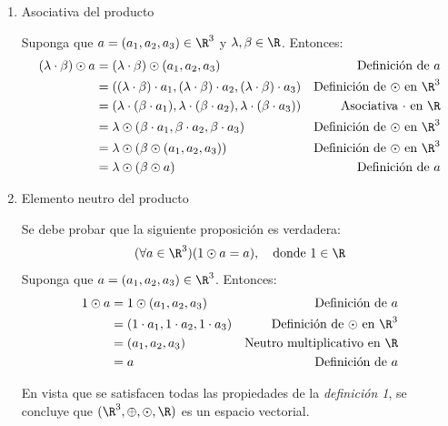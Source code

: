 \documentclass[compacto,10pt]{pubciencias-notas}
\begin{document}
\begin{ejem}
\begin{enumerate}
\item Asociativa del producto
    
Suponga que $a=(a_1,a_2,a_3)\in \R^{3}$ y $\lambda, \beta\in \R$. Entonces:
\begin{align*}
    (\lambda\cdot \beta) \odot a &= (\lambda\cdot \beta) \odot (a_1,a_2,a_3) & \text{Definición de $a$}\\
    &= ((\lambda\cdot \beta)\cdot a_1, (\lambda\cdot \beta)\cdot a_2, (\lambda\cdot \beta)\cdot a_3) & \text{Definición de $\odot$ en $\R^{3}$}\\
    &= (\lambda\cdot(\beta\cdot a_1), \lambda\cdot(\beta\cdot a_2), \lambda\cdot(\beta\cdot a_3)) & \text{Asociativa $\cdot$ en $\R$}\\
    &= \lambda \odot (\beta\cdot a_1, \beta\cdot a_2, \beta\cdot a_3) & \text{Definición de $\odot$ en $\R^{3}$}\\
    &= \lambda \odot (\beta \odot (a_1, a_2, a_3)) & \text{Definición de $\odot$ en $\R^{3}$}\\
    &= \lambda \odot (\beta \odot a) & \text{Definición de $a$}
\end{align*}
    
\item Elemento neutro del producto
    
Se debe probar que la siguiente proposición es verdadera:
\[(\forall a\in \R^{3})(1\odot a = a), \quad \text{donde } 1\in \R\]
Suponga que $a=(a_1,a_2,a_3)\in\R^{3}$. Entonces:
\begin{align*}
    1 \odot a &= 1\odot (a_1,a_2,a_3) & \text{Definición de $a$}\\
    &= (1\cdot a_1, 1\cdot a_2, 1\cdot a_3) & \text{Definición de $\odot$ en $\R^{3}$}\\
    &= (a_1,a_2,a_3) & \text{Neutro multiplicativo en $\R$}\\
    &= a & \text{Definición de $a$}
\end{align*}

En vista que se satisfacen todas las propiedades de la \emph{definición 1}, se concluye que $(\R^{3}, \oplus, \odot, \R)$ es un espacio vectorial.
\end{enumerate}
\end{ejem}

\end{document}
